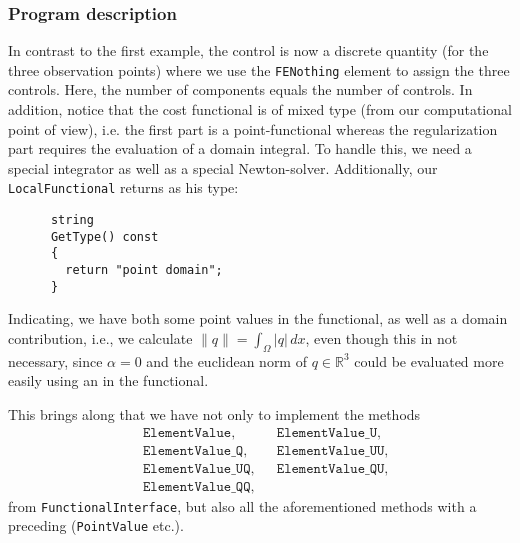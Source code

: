 \subsubsection{Program description}
{
In contrast to the first example, the control is now a discrete quantity (for
the three observation points) where we use the \texttt{FE\underline{}Nothing}
element to assign the three controls. Here, the number of components equals
the number of controls. 
In addition, }notice that the cost functional is of mixed type (from
our computational point of view), i.e. the first part is a
point-functional whereas the regularization part requires the
evaluation of a domain integral. To handle this, we need a special
integrator as well as a special Newton-solver. Additionally, our \texttt{LocalFunctional} returns as his type:
\begin{verbatim}
      string
      GetType() const
      {
        return "point domain";
      }
\end{verbatim}
Indicating, we have both some point values in the functional, as well as a domain contribution, 
i.e., we calculate $\|q\| = \int_\Omega |q|\,dx$,
even though this in not necessary, since $\alpha =0$ and the euclidean 
norm of $q\in \mathbb R^3$ could be evaluated more easily using an  in the functional.
  
This brings along that we have not only to implement {the methods
\begin{align*} 
 &\texttt{ElementValue},&&
 \texttt{ElementValue\_U},\\
 &\texttt{ElementValue\_Q}, &&
 \texttt{ElementValue\_UU},\\
 &\texttt{ElementValue\_UQ},&&
 \texttt{ElementValue\_QU},\\
 &\texttt{ElementValue\_QQ},
\end{align*}}
 from \texttt{FunctionalInterface}, but also all the aforementioned methods with a preceding  (\texttt{PointValue} etc.).

